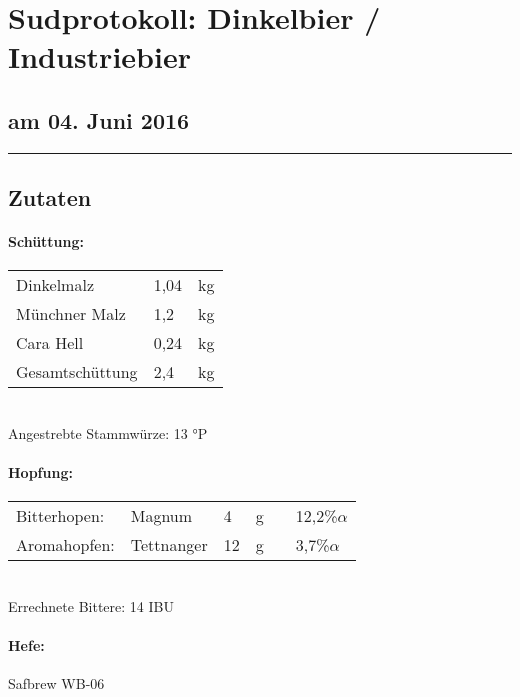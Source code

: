 \documentclass[12pt,oneside,a4paper]{scrartcl}
\begin{document}
	\begin{minipage}[c]{0.70\textwidth}
		\section*{\hspace{-.4cm}Sudprotokoll: Dinkelbier / Industriebier}
	\end{minipage}
	\begin{minipage}[c]{0.29\textwidth}
		\subsection*{am 04. Juni 2016}
	\end{minipage}
	\rule{\textwidth}{1pt}
%
\subsection*{Zutaten}
%
\paragraph{Schüttung:}
	\begin{tabular}[t]{m{8cm} m{2cm} m{1cm}}
		Dinkelmalz & 1,04 & kg \bigstrut\\
		Münchner Malz & 1,2 & kg \bigstrut\\
		Cara Hell & 0,24 & kg \bigstrut\\\hline
		Gesamtschüttung & 2,4 & kg\bigstrut
	\end{tabular}\\

\vspace{.25cm}
\hspace{1cm}Angestrebte Stammwürze: 13 °P
%
\paragraph{Hopfung:}
	\begin{tabular}[t]{m{2.5cm} m{5cm} m{0.5cm} m{1cm} m{0.5cm} m{1cm}}
		Bitterhopen: & Magnum & 4 & g &  &12,2\%$\alpha$ \\
		Aromahopfen: & Tettnanger & 12 & g &  &3,7\%$\alpha$
	\end{tabular}\\

\vspace{.25cm}
\hspace{1cm}Errechnete Bittere: 14 IBU
%
\paragraph{Hefe:}
	Safbrew WB-06
\end{document}
